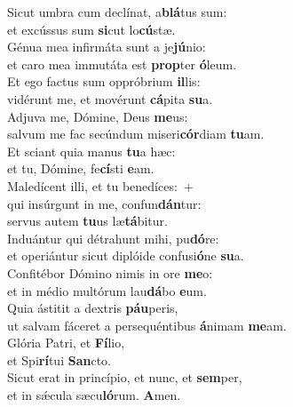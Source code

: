 \evenverse Sicut umbra cum declínat, a\textbf{blá}tus sum:~\*\\
\evenverse et excússus sum \textbf{si}cut lo\textbf{cú}stæ.\\
\oddverse Génua mea infirmáta sunt a je\textbf{jú}nio:~\*\\
\oddverse et caro mea immutáta est \textbf{prop}ter \textbf{ó}leum.\\
\evenverse Et ego factus sum oppróbrium \textbf{il}lis:~\*\\
\evenverse vidérunt me, et movérunt \textbf{cá}pita \textbf{su}a.\\
\oddverse Adjuva me, Dómine, Deus \textbf{me}us:~\*\\
\oddverse salvum me fac secúndum miseri\textbf{cór}diam \textbf{tu}am.\\
\evenverse Et sciant quia manus \textbf{tu}a hæc:~\*\\
\evenverse et tu, Dómine, fe\textbf{cí}sti \textbf{e}am.\\
\oddverse Maledícent illi, et tu benedíces:~+\\
\oddverse  qui insúrgunt in me, confun\textbf{dán}tur:~\*\\
\oddverse servus autem \textbf{tu}us læ\textbf{tá}bitur.\\
\evenverse Induántur qui détrahunt mihi, pu\textbf{dó}re:~\*\\
\evenverse et operiántur sicut diplóide confusi\textbf{ó}ne \textbf{su}a.\\
\oddverse Confitébor Dómino nimis in ore \textbf{me}o:~\*\\
\oddverse et in médio multórum lau\textbf{dá}bo \textbf{e}um.\\
\evenverse Quia ástitit a dextris \textbf{páu}peris,~\*\\
\evenverse ut salvam fáceret a persequéntibus \textbf{á}nimam \textbf{me}am.\\
\oddverse Glória Patri, et \textbf{Fí}lio,~\*\\
\oddverse et Spi\textbf{rí}tui \textbf{San}cto.\\
\evenverse Sicut erat in princípio, et nunc, et \textbf{sem}per,~\*\\
\evenverse et in sǽcula sæcu\textbf{ló}rum. \textbf{A}men.\\
